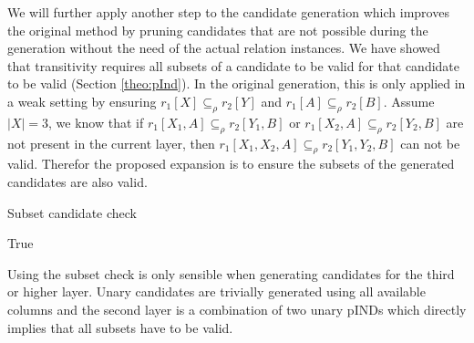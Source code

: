 We will further apply another step to the candidate generation which improves the original method by pruning candidates that are not possible during the generation without the need of the actual relation instances. We have showed that transitivity requires all subsets of a candidate to be valid for that candidate to be valid (Section \ref{theo:pInd}). In the original generation, this is only applied in a weak setting by ensuring $r_1[X] \subseteq_\rho r_2[Y]$ and $r_1[A] \subseteq_\rho r_2[B]$. Assume $|X| = 3$, we know that if $r_1[X_1, A] \subseteq_\rho r_2[Y_1, B]$ or $r_1[X_2, A] \subseteq_\rho r_2[Y_2, B]$ are not present in the current layer, then $r_1[X_1, X_2, A] \subseteq_\rho r_2[Y_1, Y_2, B]$ can not be valid. Therefor the proposed expansion is to ensure the subsets of the generated candidates are also valid.

\begin{algorithm}[hbt!]
    \caption{Subset candidate check}\label{alg:canditate_gen}

    \Return True
\end{algorithm}

Using the subset check is only sensible when generating candidates for the third or higher layer. Unary candidates are trivially generated using all available columns and the second layer is a combination of two unary pINDs which directly implies that all subsets have to be valid.

